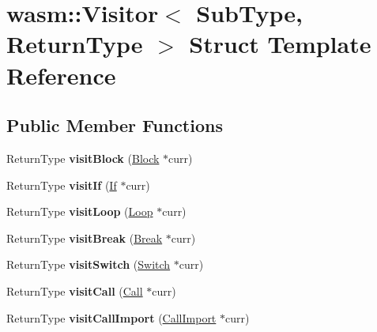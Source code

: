 \hypertarget{structwasm_1_1_visitor}{}\section{wasm\+:\+:Visitor$<$ Sub\+Type, Return\+Type $>$ Struct Template Reference}
\label{structwasm_1_1_visitor}
\subsection*{Public Member Functions}
\begin{DoxyCompactItemize}
\item 
\mbox{\label{structwasm_1_1_visitor_a8d5c0cc2ca4f45f14d95ab2e7123a4dd}} 
Return\+Type {\bfseries visit\+Block} (\mbox{\hyperlink{classwasm_1_1_block}{Block}} $\ast$curr)
\item 
\mbox{\label{structwasm_1_1_visitor_acedded901c28a9f810be8d7d3d1243ca}} 
Return\+Type {\bfseries visit\+If} (\mbox{\hyperlink{classwasm_1_1_if}{If}} $\ast$curr)
\item 
\mbox{\label{structwasm_1_1_visitor_a68a608e0743679e3959ec7daa7c624dc}} 
Return\+Type {\bfseries visit\+Loop} (\mbox{\hyperlink{classwasm_1_1_loop}{Loop}} $\ast$curr)
\item 
\mbox{\label{structwasm_1_1_visitor_a1b125a2608ccc905002bbba958948881}} 
Return\+Type {\bfseries visit\+Break} (\mbox{\hyperlink{classwasm_1_1_break}{Break}} $\ast$curr)
\item 
\mbox{\label{structwasm_1_1_visitor_a9af450385476bfd08520d80d80c7f827}} 
Return\+Type {\bfseries visit\+Switch} (\mbox{\hyperlink{classwasm_1_1_switch}{Switch}} $\ast$curr)
\item 
\mbox{\label{structwasm_1_1_visitor_a611aa074c75a5254634dda4a61cd666e}} 
Return\+Type {\bfseries visit\+Call} (\mbox{\hyperlink{classwasm_1_1_call}{Call}} $\ast$curr)
\item 
\mbox{\label{structwasm_1_1_visitor_acb356d8ac913ea4df6ec27520efab883}} 
Return\+Type {\bfseries visit\+Call\+Import} (\mbox{\hyperlink{classwasm_1_1_call_import}{Call\+Import}} $\ast$curr)

\end{DoxyCompactItemize}
